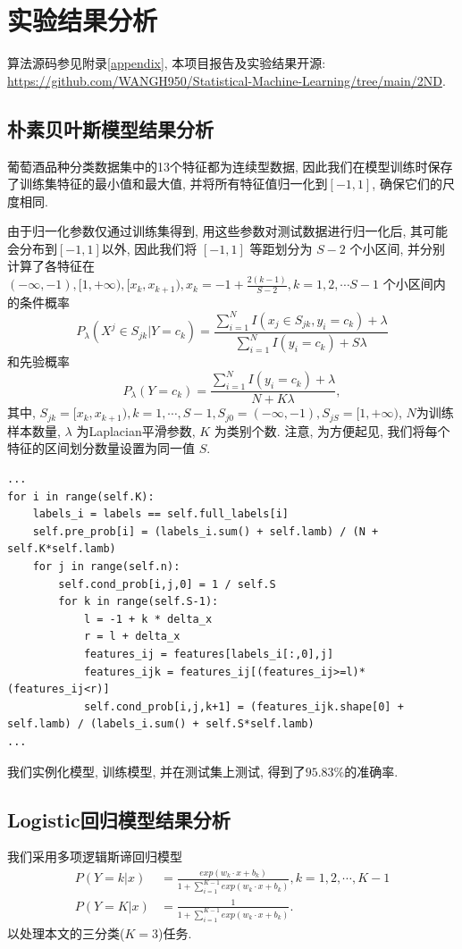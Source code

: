\section{实验结果分析}
算法源码参见附录\ref{appendix}, 本项目报告及实验结果开源: 
\url{https://github.com/WANGH950/Statistical-Machine-Learning/tree/main/2ND}.

\subsection{朴素贝叶斯模型结果分析}
葡萄酒品种分类数据集中的13个特征都为连续型数据, 因此我们在模型训练时保存了训练集特征的最小值和最大值, 并将所有特征值归一化到$[-1,1]$, 确保它们的尺度相同.

由于归一化参数仅通过训练集得到, 用这些参数对测试数据进行归一化后, 其可能会分布到$[-1,1]$以外, 因此我们将 $[-1,1]$ 等距划分为 $S - 2$ 个小区间, 并分别计算了各特征在 $(-\infty,-1), [1,+\infty), [x_k,x_{k+1}), x_k = -1+\frac{2(k-1)}{S-2}, k = 1,2,\cdots S-1$ 个小区间内的条件概率
\begin{equation}
    P_{\lambda}(X^{j}\in S_{jk}|Y = c_k) = \frac{\sum_{i=1}^{N}I(x_{j}\in S_{jk},y_i = c_k) + \lambda}{\sum_{i=1}^{N}I(y_i = c_k) + S\lambda}
\end{equation}
和先验概率
\begin{equation}
    P_{\lambda}(Y = c_k) = \frac{\sum_{i=1}^{N}I(y_i = c_k) + \lambda}{N + K\lambda},
\end{equation}
其中, $S_{jk} = [x_k,x_{k+1}),k = 1,\cdots,S-1, S_{j0} = (-\infty,-1), S_{jS} = [1,+\infty)$, $N$为训练样本数量, $\lambda$ 为Laplacian平滑参数, $K$ 为类别个数.
注意, 为方便起见, 我们将每个特征的区间划分数量设置为同一值 $S$. 

\begin{lstlisting}[caption={朴素贝叶斯模型训练算法部分源码}]
...
for i in range(self.K):
    labels_i = labels == self.full_labels[i]
    self.pre_prob[i] = (labels_i.sum() + self.lamb) / (N + self.K*self.lamb)
    for j in range(self.n):
        self.cond_prob[i,j,0] = 1 / self.S
        for k in range(self.S-1):
            l = -1 + k * delta_x
            r = l + delta_x
            features_ij = features[labels_i[:,0],j]
            features_ijk = features_ij[(features_ij>=l)*(features_ij<r)]
            self.cond_prob[i,j,k+1] = (features_ijk.shape[0] + self.lamb) / (labels_i.sum() + self.S*self.lamb)
...
\end{lstlisting}

我们实例化模型, 训练模型, 并在测试集上测试, 得到了$95.83\%$的准确率.
\subsection{Logistic回归模型结果分析}
我们采用多项逻辑斯谛回归模型
\begin{equation}
    \begin{aligned}
        P(Y = k|x) &= \frac{exp(w_k\cdot x + b_k)}{1 + \sum_{i = 1}^{K-1}exp(w_k\cdot x + b_k)}, k = 1,2,\cdots,K-1\\
        P(Y = K|x) &= \frac{1}{1 + \sum_{i = 1}^{K-1}exp(w_k\cdot x + b_k)}.
    \end{aligned}
\end{equation}
以处理本文的三分类($K=3$)任务. 


